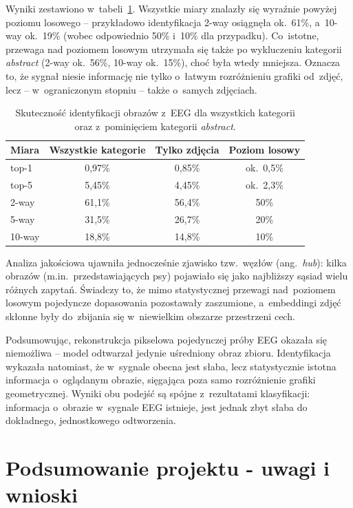 \documentclass[12pt,a4paper,numbers=enddot,headings=small]{scrartcl} %
\begin{document}
	Wyniki zestawiono w~tabeli~\ref{tab:retrieval}. Wszystkie miary znalazły się
	wyraźnie powyżej poziomu losowego -- przykładowo identyfikacja 2-way osiągnęła
	ok.~61\%, a~10-way ok.~19\% (wobec odpowiednio 50\% i~10\% dla przypadku).
	Co~istotne, przewaga nad poziomem losowym utrzymała się także po wykluczeniu
	kategorii \textit{abstract} (2-way ok.~56\%, 10-way ok.~15\%), choć była wtedy
	mniejsza. Oznacza to, że sygnał niesie informację nie tylko o~łatwym
	rozróżnieniu grafiki od~zdjęć, lecz -- w~ograniczonym stopniu -- także
	o~samych zdjęciach.
	
	\begin{table}[h]
		\centering
		\begin{tabular}{lccc}
			\hline
			Miara & Wszystkie kategorie & Tylko zdjęcia & Poziom losowy \\
			\hline
			top-1  & 0,97\% & 0,85\% & ok.~0,5\% \\
			top-5  & 5,45\% & 4,45\% & ok.~2,3\% \\
			2-way  & 61,1\% & 56,4\% & 50\% \\
			5-way  & 31,5\% & 26,7\% & 20\% \\
			10-way & 18,8\% & 14,8\% & 10\% \\
			\hline
		\end{tabular}
		\caption{Skuteczność identyfikacji obrazów z~EEG dla wszystkich kategorii
			oraz z~pominięciem kategorii \textit{abstract}.}
		\label{tab:retrieval}
	\end{table}
	
	Analiza jakościowa ujawniła jednocześnie zjawisko
	tzw.~węzłów (ang.~\textit{hub}): kilka obrazów (m.in.~przedstawiających psy)
	pojawiało się jako najbliższy sąsiad wielu różnych zapytań. Świadczy to, że
	mimo statystycznej przewagi nad~poziomem losowym pojedyncze dopasowania
	pozostawały zaszumione, a~embeddingi zdjęć skłonne były do~zbijania się
	w~niewielkim obszarze przestrzeni cech.
	
	Podsumowując, rekonstrukcja pikselowa pojedynczej próby EEG okazała się
	niemożliwa -- model odtwarzał jedynie uśredniony obraz zbioru. Identyfikacja
	wykazała natomiast, że w~sygnale obecna jest słaba, lecz statystycznie istotna
	informacja o~oglądanym obrazie, sięgająca poza samo rozróżnienie grafiki
	geometrycznej. Wyniki obu podejść są spójne z~rezultatami klasyfikacji:
	informacja o~obrazie w~sygnale EEG istnieje, jest jednak zbyt słaba do
	dokładnego, jednostkowego odtworzenia.
	
	\section{Podsumowanie projektu - uwagi i wnioski}
	
\end{document}
